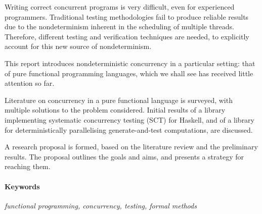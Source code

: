 Writing correct concurrent programs is very difficult, even for
experienced programmers. Traditional testing methodologies fail to
produce reliable results due to the nondeterminism inherent in the
scheduling of multiple threads. Therefore, different testing and
verification techniques are needed, to explicitly account for this new
source of nondeterminism.

This report introduces nondeterministic concurrency in a particular
setting: that of pure functional programming languages, which we shall
see has received little attention so far.

Literature on concurrency in a pure functional language is surveyed,
with multiple solutions to the problem considered. Initial results of
a library implementing systematic concurrency testing (SCT) for
Haskell, and of a library for deterministically parallelising
generate-and-test computations, are discussed.

A research proposal is formed, based on the literature review and the
preliminary results. The proposal outlines the goals and aims, and
presents a strategy for reaching them.

\vfill

\paragraph{Keywords}

\textit{functional programming, concurrency,
  testing, formal methods}